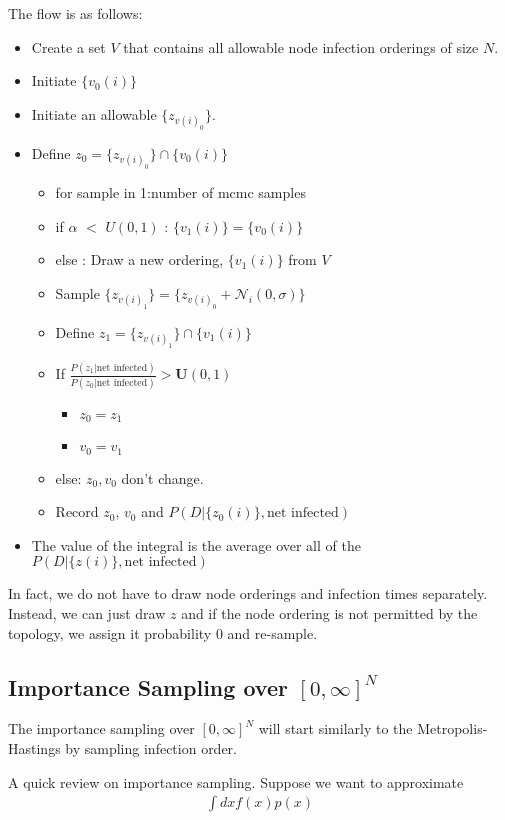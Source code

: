 \documentclass{article}
\begin{document}
The flow is as follows:
\begin{itemize}
\item Create a set $V$ that contains all allowable node infection orderings of 
size $N$.
\item Initiate $\{v_0(i)\}$
\item Initiate an allowable $\{z_{v(i)_0}\}$.
\item Define $z_0 = \{z_{v(i)_0}\} \cap \{v_0(i)\}$ 
\begin{itemize}
\item for sample in 1:number of mcmc samples
\item if $\alpha$ $<$ $U(0,1)$ : $\{v_1(i)\} = \{v_0(i)\}$
\item else : Draw a new ordering, $\{v_1(i)\}$ from $V$
\item Sample $\{z_{v(i)_1}\} = \{z_{v(i)_0} + \mathcal{N}_i(0, \sigma)\}$
\item Define $z_1 = \{z_{v(i)_1}\} \cap \{v_1(i)\}$ 
\item If $\frac{P(z_1 | \text{net infected})}{P(z_0 | \text{net infected})} > \mathbf{U}(0,1)$
\begin{itemize}
\item $z_0 =z_1$
\item $v_0 = v_1$
\end{itemize}
\item else: $z_0, v_0$ don't change.
\item Record $z_0$, $v_0$ and $P(D | \{z_0(i)\}, \text{net infected} )$
\end{itemize}
\item The value of the integral is the average over all of the $P(D | \{z(i)\}, \text{net infected} )$
\end{itemize}

In fact, we do not have to draw node orderings and infection times separately.  Instead, we can just draw $z$ and if the node ordering is not permitted by the topology, we assign it probability 0 and re-sample.  

\subsection{Importance Sampling over $[0, \infty]^N$}

The importance sampling over $[0, \infty]^N$ will start similarly to the Metropolis-Hastings by sampling infection order.

A quick review on importance sampling.  Suppose we want to approximate
\begin{align}
\int dx f(x)p(x)
\end{align}
\end{document}
